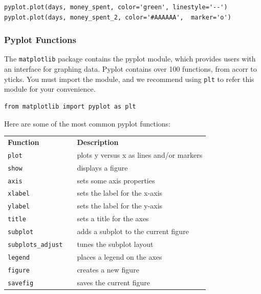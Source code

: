 \documentclass[a4paper]{article}
\begin{document}
\begin{lstlisting}[caption={}]
pyplot.plot(days, money_spent, color='green', linestyle='--')
pyplot.plot(days, money_spent_2, color='#AAAAAA',  marker='o')
\end{lstlisting}


\subsubsection{Pyplot Functions}
The \texttt{matplotlib} package contains the pyplot module, which provides users with an interface for graphing data. Pyplot contains over 100 functions, from acorr to yticks. You must import the module, and we recommend using \texttt{plt} to refer this module for your convenience.

\begin{lstlisting}
from matplotlib import pyplot as plt
\end{lstlisting}{}

Here are some of the most common pyplot functions: \\

\begin{table}[htb]
\begin{tabular}{lll}
\textbf{Function} &  & \textbf{Description}                     \\
\texttt{plot}              &  & plots y versus x as lines and/or markers \\
\texttt{show}              &  & displays a figure                        \\
\texttt{axis}              &  & sets some axis properties                \\
\texttt{xlabel}            &  & sets the label for the x-axis            \\
\texttt{ylabel}            &  & sets the label for the y-axis            \\
\texttt{title}             &  & sets a title for the axes                \\
\texttt{subplot}           &  & adds a subplot to the current figure     \\
\texttt{subplots\_adjust}  &  & tunes the subplot layout                 \\
\texttt{legend}            &  & places a legend on the axes              \\
\texttt{figure}            &  & creates a new figure                     \\
\texttt{savefig}           &  & saves the current figure                
\end{tabular}
\end{table}
\end{document}
